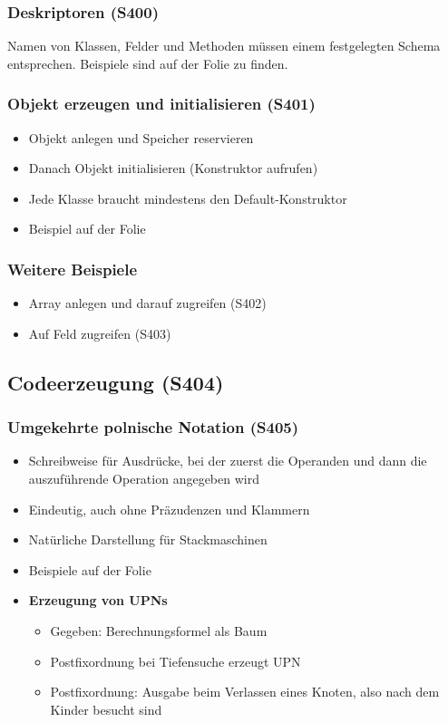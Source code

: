 \subsubsection{Deskriptoren (S400)}
Namen von Klassen, Felder und Methoden müssen einem festgelegten Schema entsprechen. Beispiele sind auf der Folie zu finden.

\subsubsection{Objekt erzeugen und initialisieren (S401)}
\begin{itemize}
	\item Objekt anlegen und Speicher reservieren
	\item Danach Objekt initialisieren (Konstruktor aufrufen)
	\item Jede Klasse braucht mindestens den Default-Konstruktor
	\item Beispiel auf der Folie
\end{itemize}

\subsubsection{Weitere Beispiele}
\begin{itemize}
	\item Array anlegen und darauf zugreifen (S402)
	\item Auf Feld zugreifen (S403)
\end{itemize}


\subsection{Codeerzeugung (S404)}

\subsubsection{Umgekehrte polnische Notation (S405)}
\begin{itemize}
	\item Schreibweise für Ausdrücke, bei der zuerst die Operanden und dann die auszuführende Operation angegeben wird
	\item Eindeutig, auch ohne Präzudenzen und Klammern
	\item Natürliche Darstellung für Stackmaschinen
	\item Beispiele auf der Folie
	\item \textbf{Erzeugung von UPNs}
	\begin{itemize}
		\item Gegeben: Berechnungsformel als Baum
		\item Postfixordnung bei Tiefensuche erzeugt UPN
		\item Postfixordnung: Ausgabe beim Verlassen eines Knoten, also nach dem Kinder besucht sind
	\end{itemize}
\end{itemize}

